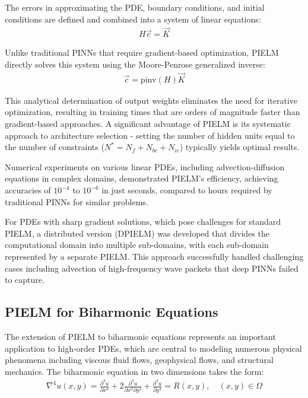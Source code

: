 \documentclass[11pt]{article}
\begin{document}
The errors in approximating the PDE, boundary conditions, and initial conditions are defined and combined into a system of linear equations:
\begin{align}
H\vec{c} = \vec{K}
\end{align}

Unlike traditional PINNs that require gradient-based optimization, PIELM directly solves this system using the Moore-Penrose generalized inverse:
\begin{align}
\vec{c} = \text{pinv}(H)\vec{K}
\end{align}

This analytical determination of output weights eliminates the need for iterative optimization, resulting in training times that are orders of magnitude faster than gradient-based approaches. A significant advantage of PIELM is its systematic approach to architecture selection - setting the number of hidden units equal to the number of constraints ($N^* = N_f + N_{bc} + N_{ic}$) typically yields optimal results.

Numerical experiments on various linear PDEs, including advection-diffusion equations in complex domains, demonstrated PIELM's efficiency, achieving accuracies of $10^{-4}$ to $10^{-6}$ in just seconds, compared to hours required by traditional PINNs for similar problems.

For PDEs with sharp gradient solutions, which pose challenges for standard PIELM, a distributed version (DPIELM) was developed that divides the computational domain into multiple sub-domains, with each sub-domain represented by a separate PIELM. This approach successfully handled challenging cases including advection of high-frequency wave packets that deep PINNs failed to capture.

\subsection{PIELM for Biharmonic Equations}

The extension of PIELM to biharmonic equations \citep{Dwivedi2020b} represents an important application to high-order PDEs, which are central to modeling numerous physical phenomena including viscous fluid flows, geophysical flows, and structural mechanics. The biharmonic equation in two dimensions takes the form:
\begin{align}
\nabla^4 u(x,y) = \frac{\partial^4 u}{\partial x^4} + 2\frac{\partial^4 u}{\partial x^2 \partial y^2} + \frac{\partial^4 u}{\partial y^4} = R(x,y), \quad (x,y) \in \Omega
\end{align}
\end{document}
